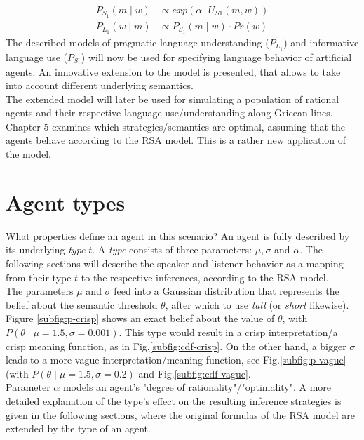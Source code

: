 \begin{align}
\label{eq:S1-rsa}
P_{S_1}(m \mid w) &\propto exp(\alpha \cdot U_{S1}(m,w))\\
P_{L_1}(w \mid m) &\propto P_{S_1}(m \mid w) \cdot Pr(w)
\label{eq:L1-rsa}
\end{align}
The described models of pragmatic language understanding ($P_{L_1}$) and informative language use ($P_{S_1}$) will now be used for specifying language behavior of artificial agents. An innovative extension to the model is presented, that allows to take into account different underlying semantics.\\
The extended model will later be used for simulating a population of rational agents and their respective language use/understanding along Gricean lines. 
Chapter 5 examines which strategies/semantics are optimal, assuming that the agents behave according to the RSA model. This is a rather new application of the model.

\section{Agent types}
What properties define an agent in this scenario? An agent is fully described by its underlying \textit{type} $t$. A \textit{type} consists of three parameters:
$\mu, \sigma$ and $\alpha$. The following sections will describe the speaker and listener behavior as a mapping from their type $t$ to the respective inferences, according to the RSA model.\\

The parameters $\mu$ and $\sigma$ feed into a Gaussian distribution that represents the belief about the semantic threshold $\theta$, after which to use \textit{tall} (or \textit{short} likewise). Figure \ref{subfig:p-crisp} shows an exact belief about the value of $\theta$, with $P(\theta \mid \mu = 1.5, \sigma=0.001)$. This type would result in a crisp interpretation/a crisp meaning function, as in Fig.\ref{subfig:cdf-crisp}. On the other hand, a bigger $\sigma$ leads to a more vague interpretation/meaning function, see Fig.\ref{subfig:p-vague} (with $P(\theta \mid \mu=1.5, \sigma=0.2)$ and Fig.\ref{subfig:cdf-vague}.\\

Parameter $\alpha$ models an agent's "degree of rationality"/"optimality".
A more detailed explanation of the type's effect on the resulting inference strategies is given in the following sections, where the original formulas of the RSA model are extended by the type of an agent.

